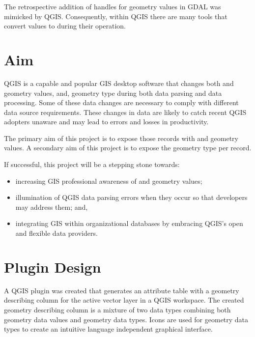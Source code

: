 \documentclass[a4paper,11pt,english]{sphinxmanual}
\begin{document}
The retrospective addition of handles for  geometry values in GDAL was mimicked by QGIS.  Consequently, within QGIS there are many tools that convert  values to  during their operation.


\chapter{Aim}
\label{\detokenize{Aims:aim}}\label{\detokenize{Aims::doc}}
QGIS is a capable and popular GIS desktop software that changes both  and  geometry values, and, geometry type during both data parsing and data processing.  Some of these data changes are necessary to comply with different data source requirements.  These changes in data are likely to catch recent QGIS adopters unaware and may lead to errors and losses in productivity.

The primary aim of this project is to expose those records with  and  geometry values.  A secondary aim of this project is to expose the geometry type per record.

If successful, this project will be a stepping stone towards:
\begin{itemize}
\item {} 
increasing GIS professional awareness of  and  geometry values;

\item {} 
illumination of QGIS data parsing errors when they occur so that developers may address them; and,

\item {} 
integrating GIS within organizational databases by embracing QGIS’s open and flexible data providers.

\end{itemize}


\chapter{Plugin Design}
\label{\detokenize{pluginDesign:plugin-design}}\label{\detokenize{pluginDesign::doc}}
A QGIS plugin was created that generates an attribute table with a geometry describing column for the active vector layer in a QGIS workspace.  The created geometry describing column is a mixture of two data types combining both geometry data values and geometry data types.  Icons are used for geometry data types to create an intuitive language independent graphical interface.
\end{document}
